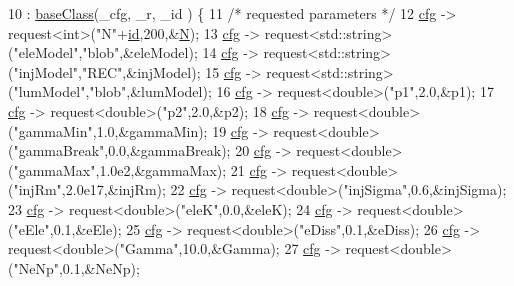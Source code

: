\begin{DoxyCode}
10                                                                   : \hyperlink{classbaseClass}{baseClass}(\_cfg, \_r, \_id ) \{
11   \textcolor{comment}{/* requested parameters */}
12   \hyperlink{classbaseClass_a744f87a6ebe63da08256c022d42a4ca7}{cfg} -> request<int>(\textcolor{stringliteral}{"N"}+\hyperlink{classbaseClass_a4d5ff386a69bcbe21b5976f55b624df6}{id},200,&\hyperlink{classbaseClass_a2b4d07d2b46197d495de0477f4bb22f8}{N});
13   \hyperlink{classbaseClass_a744f87a6ebe63da08256c022d42a4ca7}{cfg} -> request<std::string>(\textcolor{stringliteral}{"eleModel"},\textcolor{stringliteral}{"blob"},&eleModel);
14   \hyperlink{classbaseClass_a744f87a6ebe63da08256c022d42a4ca7}{cfg} -> request<std::string>(\textcolor{stringliteral}{"injModel"},\textcolor{stringliteral}{"REC"},&injModel);
15   \hyperlink{classbaseClass_a744f87a6ebe63da08256c022d42a4ca7}{cfg} -> request<std::string>(\textcolor{stringliteral}{"lumModel"},\textcolor{stringliteral}{"blob"},&lumModel);
16   \hyperlink{classbaseClass_a744f87a6ebe63da08256c022d42a4ca7}{cfg} -> request<double>(\textcolor{stringliteral}{"p1"},2.0,&p1);
17   \hyperlink{classbaseClass_a744f87a6ebe63da08256c022d42a4ca7}{cfg} -> request<double>(\textcolor{stringliteral}{"p2"},2.0,&p2);
18   \hyperlink{classbaseClass_a744f87a6ebe63da08256c022d42a4ca7}{cfg} -> request<double>(\textcolor{stringliteral}{"gammaMin"},1.0,&gammaMin);
19   \hyperlink{classbaseClass_a744f87a6ebe63da08256c022d42a4ca7}{cfg} -> request<double>(\textcolor{stringliteral}{"gammaBreak"},0.0,&gammaBreak);
20   \hyperlink{classbaseClass_a744f87a6ebe63da08256c022d42a4ca7}{cfg} -> request<double>(\textcolor{stringliteral}{"gammaMax"},1.0e2,&gammaMax);
21   \hyperlink{classbaseClass_a744f87a6ebe63da08256c022d42a4ca7}{cfg} -> request<double>(\textcolor{stringliteral}{"injRm"},2.0e17,&injRm);
22   \hyperlink{classbaseClass_a744f87a6ebe63da08256c022d42a4ca7}{cfg} -> request<double>(\textcolor{stringliteral}{"injSigma"},0.6,&injSigma);
23   \hyperlink{classbaseClass_a744f87a6ebe63da08256c022d42a4ca7}{cfg} -> request<double>(\textcolor{stringliteral}{"eleK"},0.0,&eleK);
24   \hyperlink{classbaseClass_a744f87a6ebe63da08256c022d42a4ca7}{cfg} -> request<double>(\textcolor{stringliteral}{"eEle"},0.1,&eEle);
25   \hyperlink{classbaseClass_a744f87a6ebe63da08256c022d42a4ca7}{cfg} -> request<double>(\textcolor{stringliteral}{"eDiss"},0.1,&eDiss);
26   \hyperlink{classbaseClass_a744f87a6ebe63da08256c022d42a4ca7}{cfg} -> request<double>(\textcolor{stringliteral}{"Gamma"},10.0,&Gamma);
27   \hyperlink{classbaseClass_a744f87a6ebe63da08256c022d42a4ca7}{cfg} -> request<double>(\textcolor{stringliteral}{"NeNp"},0.1,&NeNp);

\end{DoxyCode}
